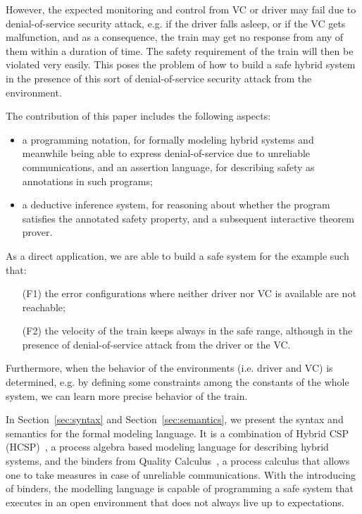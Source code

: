 \documentclass{llncs}
\begin{document}
\vspace{-1.5em}
However, the expected monitoring and control from VC or driver may fail due to denial-of-service security attack, e.g.
if the driver falls asleep, or if the VC
gets malfunction, and as a consequence, the  train may get no response from any of them within a duration of time.
The safety requirement of the train will then be violated very easily.
This  poses the problem of how to build a safe hybrid system in the presence of this sort of
denial-of-service security attack  from the environment.












The contribution of this paper includes the following aspects:
\begin{itemize}
  \item a programming notation, for formally modeling hybrid systems and meanwhile being able to express
          denial-of-service due to unreliable communications, and an assertion language, for describing safety as
          annotations in such programs;
  \item a deductive inference system, for reasoning about whether the program satisfies the annotated safety property, and a subsequent
           interactive theorem prover.
\end{itemize}
As a direct application, we are able to build a safe system for the example such that:
\begin{itemize}
\item[(F1)] the error configurations where neither driver nor VC is available are not reachable;
\item[(F2)] the velocity of the train keeps always in the safe range, although in the presence of denial-of-service
attack from the driver or the VC.
\end{itemize}
Furthermore, when the behavior of the environments (i.e. driver and VC) is determined,
e.g. by defining some constraints among the constants of the whole system, we can learn
 more precise behavior of the train.




In Section~\ref{sec:syntax} and Section~\ref{sec:semantics}, we
present the syntax and semantics for the formal modeling language. It is a combination of
Hybrid CSP (HCSP)~\cite{Jifeng:1994,Zhou:1996}, a process algebra based modeling language for describing hybrid systems,  and the binders
from Quality Calculus~\cite{RNV12}, a process calculus that allows one to take measures in case of unreliable communications.
With the introducing of binders, the modelling language is capable of programming
a safe system that executes in an open environment
that does not always live up to expectations.
\end{document}
